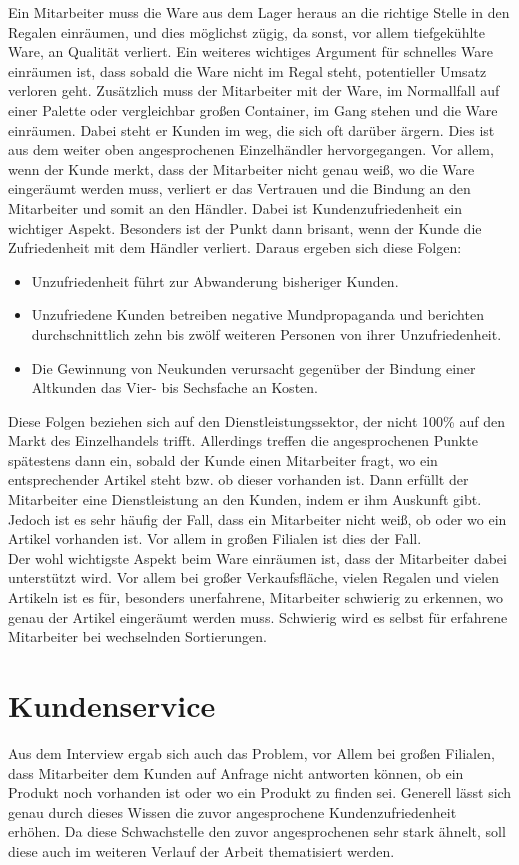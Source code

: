 Ein Mitarbeiter muss die Ware aus dem Lager heraus an die richtige Stelle in den Regalen einräumen, und dies möglichst zügig, da sonst, vor allem tiefgekühlte Ware, an Qualität verliert. Ein weiteres wichtiges Argument für schnelles Ware einräumen ist, dass sobald die Ware nicht im Regal steht, potentieller Umsatz verloren geht. Zusätzlich muss der Mitarbeiter mit der Ware, im Normallfall auf einer Palette oder vergleichbar großen Container, im Gang stehen und die Ware einräumen. Dabei steht er Kunden im weg, die sich oft darüber ärgern. Dies ist aus dem weiter oben angesprochenen Einzelhändler hervorgegangen. Vor allem, wenn der Kunde merkt, dass der Mitarbeiter nicht genau weiß, wo die Ware eingeräumt werden muss, verliert er das Vertrauen und die Bindung an den Mitarbeiter und somit an den Händler. Dabei ist Kundenzufriedenheit ein wichtiger Aspekt. Besonders ist der Punkt dann brisant, wenn der Kunde die Zufriedenheit mit dem Händler verliert. Daraus ergeben sich diese Folgen:
\\
\begin{itemize}
	\item Unzufriedenheit führt zur Abwanderung bisheriger Kunden.
	\item Unzufriedene Kunden betreiben negative Mundpropaganda und berichten durchschnittlich zehn bis zwölf weiteren Personen von ihrer Unzufriedenheit.
	\item Die Gewinnung von Neukunden verursacht gegenüber der Bindung einer Altkunden das Vier- bis Sechsfache an Kosten.
\end{itemize}

Diese Folgen beziehen sich auf den Dienstleistungssektor, der nicht 100\% auf den Markt des Einzelhandels trifft. Allerdings treffen die angesprochenen Punkte spätestens dann ein, sobald der Kunde einen Mitarbeiter fragt, wo ein entsprechender Artikel steht bzw. ob dieser vorhanden ist. Dann erfüllt der Mitarbeiter eine Dienstleistung an den Kunden, indem er ihm Auskunft gibt. Jedoch ist es sehr häufig der Fall, dass ein Mitarbeiter nicht weiß, ob oder wo ein Artikel vorhanden ist. Vor allem in großen Filialen ist dies der Fall.\\
Der wohl wichtigste Aspekt beim Ware einräumen ist, dass der Mitarbeiter dabei unterstützt wird. Vor allem bei großer Verkaufsfläche, vielen Regalen und vielen Artikeln ist es für, besonders unerfahrene, Mitarbeiter schwierig zu erkennen, wo genau der Artikel eingeräumt werden muss. Schwierig wird es selbst für erfahrene Mitarbeiter bei wechselnden Sortierungen.
\section{Kundenservice}
Aus dem Interview ergab sich auch das Problem, vor Allem bei großen Filialen, dass Mitarbeiter dem Kunden auf Anfrage nicht antworten können, ob ein Produkt noch vorhanden ist oder wo ein Produkt zu finden sei. Generell lässt sich genau durch dieses Wissen die zuvor angesprochene Kundenzufriedenheit erhöhen. Da diese Schwachstelle den zuvor angesprochenen sehr stark ähnelt, soll diese auch im weiteren Verlauf der Arbeit thematisiert werden. 
